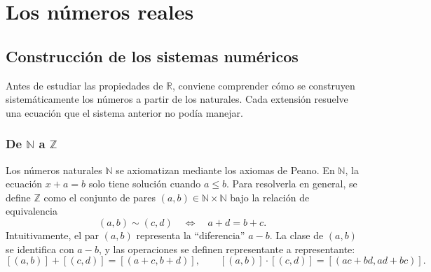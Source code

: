 \chapter{Los números reales}
\label{ap:numeros-reales}

\section{Construcción de los sistemas numéricos}

Antes de estudiar las propiedades de $\mathbb{R}$, conviene comprender cómo se construyen sistemáticamente los números a partir de los naturales. Cada extensión resuelve una ecuación que el sistema anterior no podía manejar.

\begin{center}
\end{center}

\subsection{De \texorpdfstring{$\mathbb{N}$}{N} a \texorpdfstring{$\mathbb{Z}$}{Z}}

Los números naturales $\mathbb{N}$ se axiomatizan mediante los axiomas de Peano. En $\mathbb{N}$, la ecuación $x+a=b$ solo tiene solución cuando $a\leq b$. Para resolverla en general, se define $\mathbb{Z}$ como el conjunto de pares $(a,b)\in\mathbb{N}\times\mathbb{N}$ bajo la relación de equivalencia
\[
  (a,b)\sim(c,d)\quad\Longleftrightarrow\quad a+d=b+c.
\]
Intuitivamente, el par $(a,b)$ representa la ``diferencia'' $a-b$. La clase de $(a,b)$ se identifica con $a-b$, y las operaciones se definen representante a representante:
\[
  [(a,b)]+[(c,d)]=[(a+c,b+d)],\qquad [(a,b)]\cdot[(c,d)]=[(ac+bd,ad+bc)].
\]

